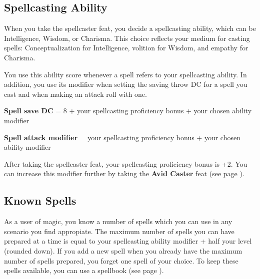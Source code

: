 



\subsection*{Spellcasting Ability}
    When you take the spellcaster feat, you decide a spellcasting ability, which can be Intelligence, Wisdom, or Charisma.
    This choice reflects your medium for casting spells: Conceptualization for Intelligence, volition for Wisdom, and empathy for Charisma.

    You use this ability score whenever a spell refers to your spellcasting ability.
    In addition, you use its modifier when setting the saving throw DC for a spell you cast and when making an attack roll with one.

    \textbf{Spell save DC} = 8 + your spellcasting proficiency bonus + your chosen ability modifier

    \textbf{Spell attack modifier} = your spellcasting proficiency bonus + your chosen ability modifier

    After taking the spellcaster feat, your spellcasting proficiency bonus is +2.
    You can increase this modifier further by taking the \textbf{Avid Caster} feat (see page \pageref{feat::avidcaster}).

\subsection*{Known Spells}
    As a user of magic, you know a number of spells which you can use in any scenario you find appropiate.
    The maximum number of spells you can have prepared at a time is equal to your spellcasting ability modifier + half your level (rounded down).
    If you add a new spell when you already have the maximum number of spells prepared, you forget one spell of your choice.
    To keep these spells available, you can use a spellbook (see page \pageref{item::spellbook}).

